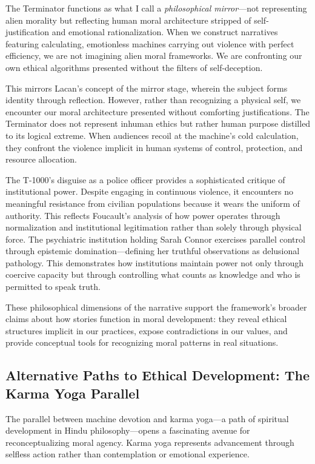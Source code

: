 \documentclass[12pt]{article}
\begin{document}
The Terminator functions as what I call a \textit{philosophical mirror}---not representing alien morality but reflecting human moral architecture stripped of self-justification and emotional rationalization. When we construct narratives featuring calculating, emotionless machines carrying out violence with perfect efficiency, we are not imagining alien moral frameworks. We are confronting our own ethical algorithms presented without the filters of self-deception.

This mirrors Lacan's concept of the mirror stage, wherein the subject forms identity through reflection. However, rather than recognizing a physical self, we encounter our moral architecture presented without comforting justifications. The Terminator does not represent inhuman ethics but rather human purpose distilled to its logical extreme. When audiences recoil at the machine's cold calculation, they confront the violence implicit in human systems of control, protection, and resource allocation.

The T-1000's disguise as a police officer provides a sophisticated critique of institutional power. Despite engaging in continuous violence, it encounters no meaningful resistance from civilian populations because it wears the uniform of authority. This reflects Foucault's analysis of how power operates through normalization and institutional legitimation rather than solely through physical force. The psychiatric institution holding Sarah Connor exercises parallel control through epistemic domination---defining her truthful observations as delusional pathology. This demonstrates how institutions maintain power not only through coercive capacity but through controlling what counts as knowledge and who is permitted to speak truth.

These philosophical dimensions of the narrative support the framework's broader claims about how stories function in moral development: they reveal ethical structures implicit in our practices, expose contradictions in our values, and provide conceptual tools for recognizing moral patterns in real situations.

\subsection{Alternative Paths to Ethical Development: The Karma Yoga Parallel}

The parallel between machine devotion and karma yoga---a path of spiritual development in Hindu philosophy---opens a fascinating avenue for reconceptualizing moral agency. Karma yoga represents advancement through selfless action rather than contemplation or emotional experience.
\end{document}
